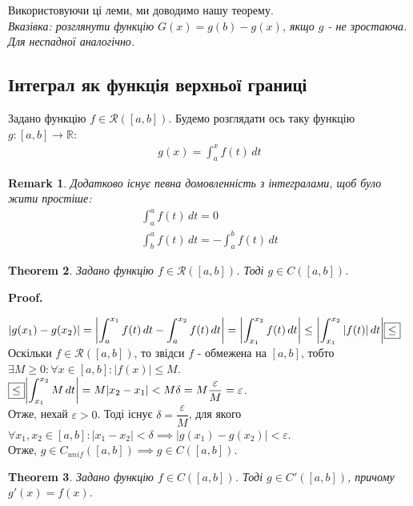 \documentclass[a4paper, 10pt]{article}
\makeatletter
\def\huge{\displaystyle}
\def\qed{$\blacksquare$}
\theoremstyle{theoremdd}
\newtheorem{theorem}{Theorem}[subsection]
\theoremstyle{theoremdd}
\theoremstyle{theoremdd}
\theoremstyle{theoremdd}
\theoremstyle{theoremdd}
\theoremstyle{theoremdd}
\newtheorem{remark}[theorem]{Remark}
\theoremstyle{theoremdd}
\theoremstyle{theoremdd}
\renewenvironment{proof}[1][Proof.\\]{\par
\pushQED{\hfill \qed}%
\normalfont \topsep6\p@\@plus6\p@\relax
\trivlist
\item\relax
{\bfseries
#1\@addpunct{.}}\hspace\labelsep\ignorespaces
}{%
\popQED\endtrivlist\@endpefalse
}
\makeatother
\begin{document}
Використовуючи ці леми, ми доводимо нашу теорему.\\
\textit{Вказівка: розглянути функцію $G(x) = g(b) - g(x)$, якщо $g$ - не зростаюча. Для неспадної аналогічно.}


\subsection{Інтеграл як функція верхньої границі}
Задано функцію $f \in \mathcal{R}([a,b])$. Будемо розглядати ось таку функцію $g: [a,b] \to \mathbb{R}$:
\begin{align*}
g(x) = \int_a^x f(t)\,dt
\end{align*}

\begin{remark}
Додатково існує певна домовленність з інтегралами, щоб було жити простіше:
\begin{align*}
\int_a^a f(t)\,dt = 0 \\
\int_b^a f(t)\,dt = -\int_a^b f(t)\,dt
\end{align*}
\end{remark}

\begin{theorem}
Задано функцію $f \in \mathcal{R}([a,b])$. Тоді $g \in C([a,b])$.
\end{theorem}

\begin{proof}
$|g(x_1)-g(x_2)| = \huge \abs{\int_a^{x_1} f(t)\,dt - \int_a^{x_2} f(t)\,dt} = \abs{\int_{x_1}^{x_2} f(t)\,dt} \leq \abs{\int_{x_1}^{x_2} |f(t)|\,dt} \boxed{\leq}$\\
Оскільки $f \in \mathcal{R}([a,b])$, то звідси $f$ - обмежена на $[a,b]$, тобто $\exists M \geq 0: \forall x \in [a,b]: |f(x)| \leq M$.\\
$\boxed{\leq} \abs{\huge\int_{x_1}^{x_2} M \,dt} = M |x_2-x_1| < M \delta = M \dfrac{\varepsilon}{M} = \varepsilon$.\\
Отже, нехай $\varepsilon > 0$. Тоді існує $\delta = \dfrac{\varepsilon}{M}$, для якого $\forall x_1,x_2 \in [a,b]: |x_1-x_2| < \delta \implies |g(x_1)-g(x_2)| < \varepsilon$.\\
Отже, $g \in C_{unif}([a,b]) \implies g \in C([a,b])$.
\end{proof}

\begin{theorem}
Задано функцію $f \in C([a,b])$. Тоді $g \in C'([a,b])$, причому $g'(x) = f(x)$.
\end{theorem}
\end{document}
